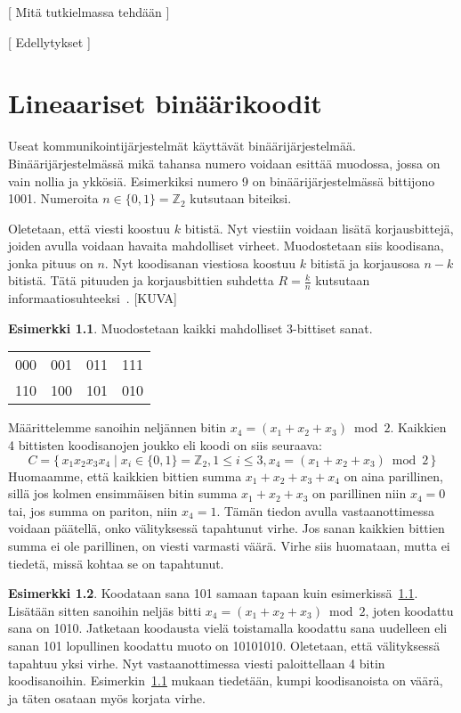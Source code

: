 \documentclass[a4paper,12pt,leqno,oneside]{report} %
\theoremstyle{plain}
\theoremstyle{plain}
\theoremstyle{definition}
\newtheorem{esimerkki}{Esimerkki}[chapter]
\theoremstyle{remark}
\numberwithin{equation}{chapter}
\newcommand*{\Zset}{\mathbb{Z}}  %
\begin{document}
    [ Mitä tutkielmassa tehdään ]


    [ Edellytykset ]

    \chapter{Lineaariset binäärikoodit}\label{ch: Lineaariset binäärikoodit}

    Useat kommunikointijärjestelmät käyttävät binäärijärjestelmää. Binäärijärjestelmässä mikä tahansa numero voidaan esittää muodossa, jossa on vain nollia ja ykkösiä. Esimerkiksi numero 9 on binäärijärjestelmässä bittijono 1001. Numeroita
    $n \in \{ 0, 1 \} = \Zset_2$ kutsutaan biteiksi.

    Oletetaan, että viesti koostuu $k$ bitistä. Nyt viestiin voidaan lisätä korjausbittejä, joiden avulla voidaan havaita mahdolliset virheet. Muodostetaan siis koodisana, jonka pituus on $n$. Nyt koodisanan viestiosa koostuu $k$ bitistä ja korjausosa $n-k$ bitistä. Tätä pituuden ja korjausbittien suhdetta $R = \frac{k}{n}$ kutsutaan informaatiosuhteeksi~\cite[s.~267]{GW}.
    [KUVA]
    \begin{esimerkki}\label{esim:3bitsanat}
        Muodostetaan kaikki mahdolliset 3-bittiset sanat.
        \begin{center}
            \begin{tabular}[t]{llll}
                000 & 001 & 011 & 111 \\
                110 & 100 & 101 & 010 \\
            \end{tabular}
        \end{center}
        Määrittelemme sanoihin neljännen bitin
        $x_4 = (x_1 + x_2 + x_3) \bmod2$. Kaikkien 4 bittisten koodisanojen joukko eli koodi on siis seuraava:
        \[
            C = \{\, x_1x_2x_3x_4 \mid  x_i \in \{0,1\} = \Zset_2, 1 \le i \le 3, x_4 = (x_1 + x_2 + x_3) \bmod2\,\}
        \]
        Huomaamme, että kaikkien bittien summa $x_1 + x_2 + x_3 + x_4$ on aina parillinen, sillä jos kolmen ensimmäisen bitin summa $x_1 + x_2 + x_3$ on parillinen niin $x_4 = 0$ tai, jos summa on pariton, niin $x_4 = 1$.
        Tämän tiedon avulla vastaanottimessa voidaan päätellä, onko välityksessä tapahtunut virhe. Jos sanan kaikkien bittien summa ei ole parillinen, on viesti varmasti väärä. Virhe siis huomataan, mutta ei tiedetä, missä kohtaa se on tapahtunut.
    \end{esimerkki}
    \begin{esimerkki}\label{esim:3bitsanatjatko}
        Koodataan sana 101 samaan tapaan kuin
        esimerkissä~\ref{esim:3bitsanat}. Lisätään sitten sanoihin neljäs bitti $x_4 = (x_1 + x_2 + x_3) \bmod2$, joten koodattu sana on 1010. Jatketaan koodausta vielä toistamalla koodattu sana uudelleen eli sanan 101 lopullinen koodattu muoto on 10101010. Oletetaan, että välityksessä tapahtuu yksi virhe. Nyt vastaanottimessa viesti paloittellaan 4 bitin koodisanoihin. Esimerkin~\ref{esim:3bitsanat} mukaan tiedetään, kumpi koodisanoista on väärä, ja täten osataan myös korjata virhe.
    \end{esimerkki}
\end{document}
